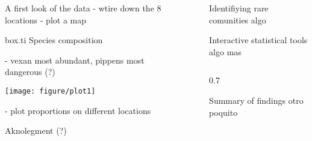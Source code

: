 \documentclass[final]{beamer}\usepackage[]{graphicx}\usepackage[]{color}
\makeatletter
\def\maxwidth{ %
  \ifdim\Gin@nat@width>\linewidth
    \linewidth
  \else
    \Gin@nat@width
  \fi
}
\newenvironment{knitrout}{}{} %
\newlength{\onecolwid}
\newlength{\twocolwid}
\newlength{\threecolwid}
\makeatother
\begin{document}
\begin{frame}
\begin{columns}[t,totalwidth=\threecolwid]
\begin{column}{\onecolwid}
\begin{alertblock}{ A first look of the data }
- wtire down the 8 locations 
- plot a map

\begin{beamercolorbox}{box.ti}
Species composition
\end{beamercolorbox}
- vexan most abundant, pippens most dangerous (?) 

\begin{knitrout}
\color{fgcolor}
\texttt{[image: figure/plot1]} 

\end{knitrout}


- plot proportions on different locations
\end{alertblock}


\begin{alertblock}{ Aknolegment (?) }

\end{alertblock}

\end{column}  %

\begin{column}{1cm}\end{column}      %


  \begin{column}{\twocolwid}

      \begin{alertblock}{ Identifiying rare comunities }
        algo 
      \end{alertblock}

      \begin{alertblock}{ Interactive statistical tools }
          algo mas 
      \end{alertblock}

      \begin{block}
      
        \begin{columns}[t,totalwidth=0.99\twocolwid ]
            
        \begin{column}{0.7\twocolwid}
              \begin{alertblock}{Summary of findings}
                    otro poquito
                \end{alertblock}
        \end{column}


\end{columns}
\end{block}
\end{column}
\end{columns}
\end{frame}
\end{document}
